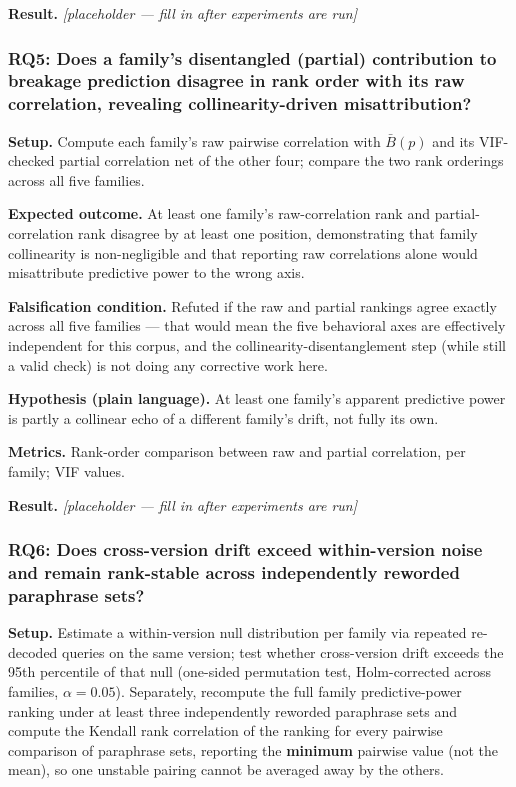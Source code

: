 \documentclass[11pt]{article}
\newcommand{\ph}{\textit{[placeholder --- fill in after experiments are run]}}
\begin{document}
\textbf{Result.} \ph

\subsubsection{RQ5: Does a family's disentangled (partial) contribution to breakage prediction disagree in rank order with its raw correlation, revealing collinearity-driven misattribution?}
\textbf{Setup.} Compute each family's raw pairwise correlation with $\bar{B}(p)$ and its VIF-checked partial correlation net of the other four; compare the two rank orderings across all five families.

\textbf{Expected outcome.} At least one family's raw-correlation rank and partial-correlation rank disagree by at least one position, demonstrating that family collinearity is non-negligible and that reporting raw correlations alone would misattribute predictive power to the wrong axis.

\textbf{Falsification condition.} Refuted if the raw and partial rankings agree exactly across all five families --- that would mean the five behavioral axes are effectively independent for this corpus, and the collinearity-disentanglement step (while still a valid check) is not doing any corrective work here.

\textbf{Hypothesis (plain language).} At least one family's apparent predictive power is partly a collinear echo of a different family's drift, not fully its own.

\textbf{Metrics.} Rank-order comparison between raw and partial correlation, per family; VIF values.

\textbf{Result.} \ph

\subsubsection{RQ6: Does cross-version drift exceed within-version noise and remain rank-stable across independently reworded paraphrase sets?}
\textbf{Setup.} Estimate a within-version null distribution per family via repeated re-decoded queries on the same version; test whether cross-version drift exceeds the 95th percentile of that null (one-sided permutation test, Holm-corrected across families, $\alpha = 0.05$). Separately, recompute the full family predictive-power ranking under at least three independently reworded paraphrase sets and compute the Kendall rank correlation of the ranking for every pairwise comparison of paraphrase sets, reporting the \textbf{minimum} pairwise value (not the mean), so one unstable pairing cannot be averaged away by the others.
\end{document}
